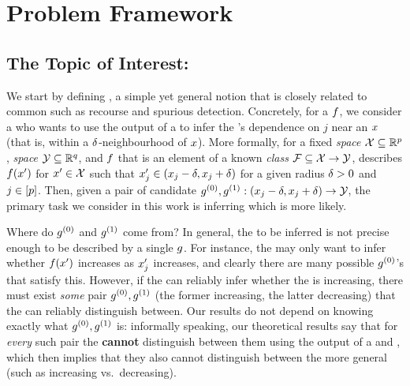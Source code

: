 %

\section{Problem Framework}\label{sec:notation}

%
%
%



\subsection{The Topic of Interest: \countmodbehaviourNAME{}}\label{sec:counterfactual}
We start by defining \countmodbehaviourname{}, a simple yet general notion that is closely related to common \downtasknames{} such as recourse and spurious \covname{} detection.
Concretely, for a \modelname{} $f$,
%
we consider a \username{} who wants to use the output of a \fielddefname{} to infer the \modelname{}'s dependence on \covname{} $j$ 
%
near an \obsname{} $x$ (that is, within a $\delta$-neighbourhood of $x$).
More formally, for a fixed
\emph{\covname{} space} $\mathcal{X} \subseteq \mathbb{R}^p$, \emph{\dataname{} space} $\mathcal{Y} \subseteq \mathbb{R}^q$, and \emph{\modelname{}} $f$ that is an element of a known \emph{\modelname{} class} $\mathcal{F}\subseteq\mathcal{X}\to\mathcal{Y}$,
\countmodbehaviourname{} describes $f(x')$ for $x'\in\mathcal{X}$ such that $x'_{j} \in (x_{j}-\delta, x_{j}+\delta)$ for a given radius $\delta>0$ and \covname{} $j\in[p]$.
Then, given a pair of candidate \emph{\modbehaviournames{}} $g^{(0)}, g^{(1)}: (x_{j}-\delta, x_{j}+\delta) \to \mathcal{Y}$, the primary task we consider in this work is inferring which \modbehaviourname{} is more likely. 

Where do  $g^{(0)}$ and $g^{(1)}$ come from? 
In general, the \countmodbehaviourname{} to be inferred is not precise enough to be described by a single $g$.
For instance, the \username{} may only want to infer whether $f(x')$ increases as $x'_{j}$ increases, and clearly there are many possible $g^{(0)}$'s that satisfy this.
However, if the \username{} can reliably infer whether the \modelname{} is increasing, there must exist \emph{some} pair $g^{(0)}, g^{(1)}$ (the former increasing, the latter decreasing) that the \username{} can reliably distinguish between.
Our results do not depend on knowing exactly what $g^{(0)}, g^{(1)}$ is:
informally speaking, our theoretical results say that for \emph{every} such pair the \username{} \textbf{cannot} distinguish between them using the output of a \completename{} and \additivename{} \fielddefname{}, which then implies that they also cannot distinguish between the more general \behaviourname{} (such as increasing vs.\ decreasing).

